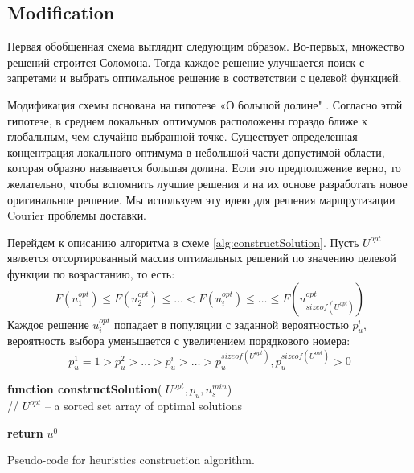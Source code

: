 \documentclass[]{TAACpaper}
\begin{document}
\subsection{Modification}
Первая обобщенная схема выглядит следующим образом. Во-первых, множество решений строится Соломона. Тогда каждое решение улучшается поиск с запретами и выбрать оптимальное решение в соответствии с целевой функцией.

Модификация схемы основана на гипотезе «О большой долине" \cite{opt_Kochetov}.  Согласно этой гипотезе, в среднем локальных оптимумов расположены гораздо ближе к глобальным, чем случайно выбранной точке. Существует определенная концентрация локального оптимума в небольшой части допустимой области, которая образно называется большая долина. Если это предположение верно, то желательно, чтобы вспомнить лучшие решения и на их основе разработать новое оригинальное решение. Мы используем эту идею для решения маршрутизации Courier проблемы доставки.

Перейдем к описанию алгоритма в схеме \ref{alg:constructSolution}. Пусть $U^{opt}$ является отсортированный массив оптимальных решений по значению целевой функции по возрастанию, то есть:
\begin{equation} \label{u_sorted}
F(u^{opt}_1) \leq F(u^{opt}_2) \leq \ldots < F(u^{opt}_i) \leq \ldots \leq F(u^{opt}_{sizeof(U^{opt})})
\end{equation}
Каждое решение $u^{opt}_i$ попадает в популяции с заданной вероятностью $p^i_u$, вероятность выбора уменьшается с увеличением порядкового номера:
\begin{equation} \label{p_sorted}
p^1_u = 1 > p^2_u > \ldots > p^i_u> \ldots   > p^{sizeof(U^{opt})}_u,  p^{sizeof(U^{opt})}_u > 0
\end{equation}

\begin{algorithm}[H]

	\textbf{function constructSolution}( $U^{opt}, p_u, n^{min}_s$) \\
	// $U^{opt}$ -- a sorted set array of optimal solutions \\
	
	
	
	
	
	\textbf{return} $u^0$
	
	\caption{Pseudo-code for heuristics construction algorithm.}
	\label{alg:constructSolution}
\end{algorithm}
\end{document}
